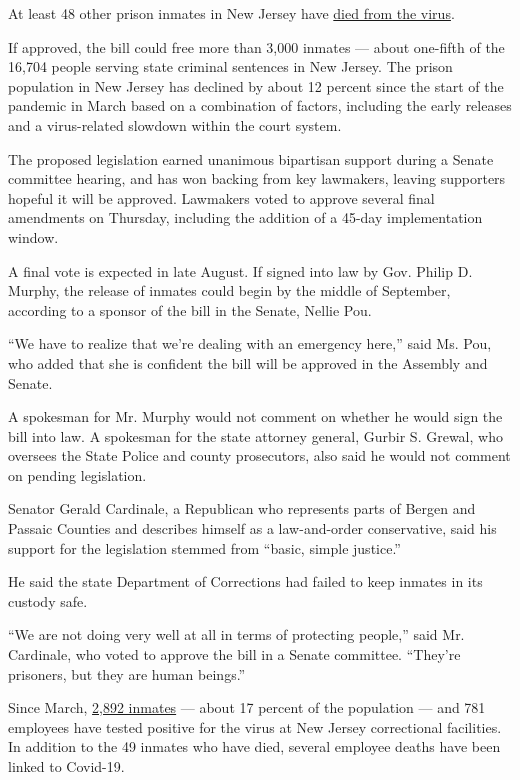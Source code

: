 At least 48 other prison inmates in New Jersey have
\href{https://www.njdoc.gov/pages/COVID19Updates.shtml}{died from the
virus}.

If approved, the bill could free more than 3,000 inmates --- about
one-fifth of the 16,704 people serving state criminal sentences in New
Jersey. The prison population in New Jersey has declined by about 12
percent since the start of the pandemic in March based on a combination
of factors, including the early releases and a virus-related slowdown
within the court system.

The proposed legislation earned unanimous bipartisan support during a
Senate committee hearing, and has won backing from key lawmakers,
leaving supporters hopeful it will be approved. Lawmakers voted to
approve several final amendments on Thursday, including the addition of
a 45-day implementation window.

A final vote is expected in late August. If signed into law by Gov.
Philip D. Murphy, the release of inmates could begin by the middle of
September, according to a sponsor of the bill in the Senate, Nellie Pou.

``We have to realize that we're dealing with an emergency here,'' said
Ms. Pou, who added that she is confident the bill will be approved in
the Assembly and Senate.

A spokesman for Mr. Murphy would not comment on whether he would sign
the bill into law. A spokesman for the state attorney general, Gurbir S.
Grewal, who oversees the State Police and county prosecutors, also said
he would not comment on pending legislation.

Senator Gerald Cardinale, a Republican who represents parts of Bergen
and Passaic Counties and describes himself as a law-and-order
conservative, said his support for the legislation stemmed from ``basic,
simple justice.''

He said the state Department of Corrections had failed to keep inmates
in its custody safe.

``We are not doing very well at all in terms of protecting people,''
said Mr. Cardinale, who voted to approve the bill in a Senate committee.
``They're prisoners, but they are human beings.''

Since March,
\href{https://www.njdoc.gov/pages/COVID19Updates.shtml}{2,892 inmates}
--- about 17 percent of the population --- and 781 employees have tested
positive for the virus at New Jersey correctional facilities. In
addition to the 49 inmates who have died, several employee deaths have
been linked to Covid-19.


